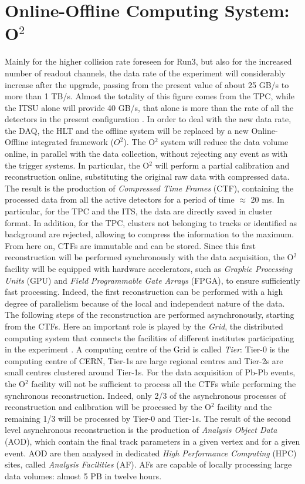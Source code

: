 \section{Online-Offline Computing System: O$^2$}
Mainly for the higher collision rate foreseen for Run3, but also for the increased number of readout channels, the data rate of the experiment will considerably increase after the upgrade, passing from the present value of about 25 GB/s to more than 1 TB/s. Almost the totality of this figure comes from the TPC, while the ITSU alone will provide 40 GB/s, that alone is more than the rate of all the detectors in the present configuration \cite{o2}. In order to deal with the new data rate, the DAQ, the HLT and the offline system will be replaced by a new Online-Offline integrated framework ($O^2$). The O$^2$ system will reduce the data volume online, in parallel with the data collection, without rejecting any event as with the trigger systems. In particular, the O$^2$ will perform a partial calibration and reconstruction online, substituting the original raw data with compressed data. The result is the production of \textit{Compressed Time Frames} (CTF), containing the processed data from all the active detectors for a period of time $\approx$ 20 ms. In particular, for the TPC and the ITS, the data are directly saved in cluster format. In addition, for the TPC, clusters not belonging to tracks or identified as background are rejected, allowing to compress the information to the maximum. From here on, CTFs are immutable and can be stored. Since this first reconstruction will be performed synchronously with the data acquisition, the O$^2$ facility will be equipped with hardware accelerators, such as \textit{Graphic Processing Units} (GPU) and \textit{Field Programmable Gate Arrays} (FPGA), to ensure sufficiently fast processing. Indeed, the first reconstruction can be performed with a high degree of parallelism because of the local and independent nature of the data. The following steps of the reconstruction are performed asynchronously, starting from the CTFs. Here an important role is played by the \textit{Grid}, the distributed computing system that connects the facilities of different institutes participating in the experiment \cite{tdrold}. A computing centre of the Grid is called \textit{Tier}: Tier-0 is the computing centre of CERN, Tier-1s are large regional centres and Tier-2s are small centres clustered around Tier-1s. For the data acquisition of Pb-Pb events, the O$^2$ facility will not be sufficient to process all the CTFs while performing the synchronous reconstruction. Indeed, only 2/3 of the asynchronous processes of reconstruction and calibration will be processed by the O$^2$ facility and the remaining 1/3 will be processed by Tier-0 and Tier-1s. The result of the second level asynchronous reconstruction is the production of \textit{Analysis Object Data} (AOD), which contain the final track parameters in a given vertex and for a given event. AOD are then analysed in dedicated \textit{High Performance Computing} (HPC) sites, called \textit{Analysis Facilities} (AF). AFs are capable of locally processing large data volumes: almost 5 PB in twelve hours.